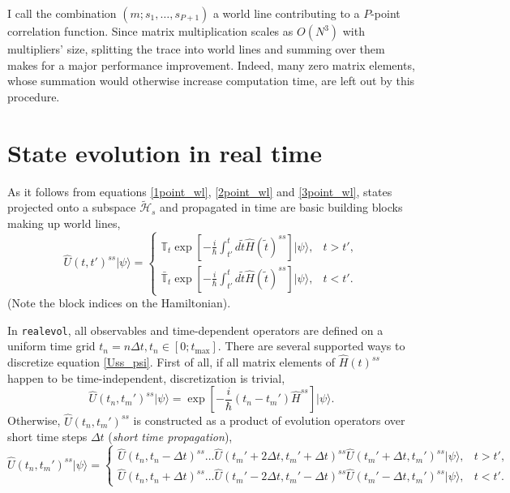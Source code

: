 \documentclass[]{article}
\newcommand{\realevol}{\texttt{realevol}}
\newcommand{\ket}[1]{\ensuremath{|#1\rangle}}
\begin{document}
I call the combination $(m; s_1,\ldots,s_{P+1})$ a world line contributing to a $P$-point correlation function. Since matrix multiplication scales as $O(N^3)$ with multipliers' size, splitting the trace into world lines and summing over them makes for a major performance improvement. Indeed, many zero matrix elements, whose summation would otherwise increase computation time, are left out by this procedure.

\section{\label{sec:evol} State evolution in real time}

As it follows from equations \ref{1point_wl}, \ref{2point_wl} and \ref{3point_wl}, states projected onto a subspace $\mathcal{\tilde H}_s$ and propagated in time are basic building blocks making up world lines,
\begin{equation}\label{Uss_psi}
    \hat U(t,t')^{ss}\ket{\psi} =
    \left\{
    \begin{array}{ll}
    \mathbb{T}_t\exp\left[
    -\frac{i}{\hbar}\int_{t'}^t d\tilde t\hat H(\tilde t)^{ss} \right]\ket{\psi}, &t>t',\\
    \mathbb{\bar T}_t\exp\left[
    -\frac{i}{\hbar}\int_{t'}^t d\tilde t\hat H(\tilde t)^{ss} \right]\ket{\psi}, &t<t'.
    \end{array}
    \right.
\end{equation}
(Note the block indices on the Hamiltonian).

In \realevol, all observables and time-dependent operators are defined on a uniform time grid $t_n = n\Delta t, t_n\in[0;t_\mathrm{max}]$. There are several supported ways to discretize equation \ref{Uss_psi}. First of all, if all matrix elements of $\hat H(t)^{ss}$ happen to be time-independent, discretization is trivial,
\begin{equation}\label{U_psi_static}
    \hat U(t_n,t_m')^{ss}\ket{\psi} =
    \exp\left[-\frac{i}{\hbar}(t_n-t_m')\hat H^{ss} \right]\ket{\psi}.
\end{equation}
Otherwise, $\hat U(t_n,t_m')^{ss}$ is constructed as a product of evolution operators over short time steps $\Delta t$ (\textit{short time propagation}),
\begin{equation}
    \hat U(t_n,t_m')^{ss}\ket{\psi} =
    \left\{
    \begin{array}{ll}
        \hat U(t_n,t_n-\Delta t)^{ss}\ldots
        \hat U(t_m'+2\Delta t,t_m'+\Delta t)^{ss}
        \hat U(t_m'+\Delta t,t_m')^{ss}\ket{\psi}, &t>t',\\
        \hat U(t_n,t_n+\Delta t)^{ss}\ldots
        \hat U(t_m'-2\Delta t,t_m'-\Delta t)^{ss}
        \hat U(t_m'-\Delta t,t_m')^{ss}\ket{\psi}, &t<t'.
    \end{array}
\right.
\end{equation}
\end{document}
